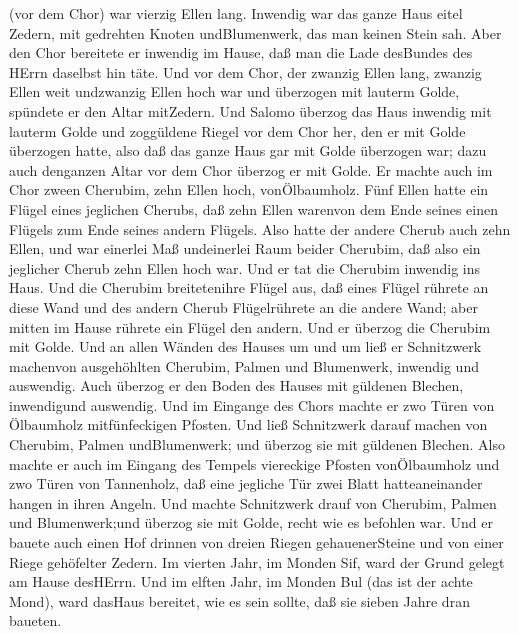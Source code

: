 (vor dem Chor) war vierzig Ellen lang.  Inwendig war das
ganze Haus eitel Zedern, mit gedrehten Knoten undBlumenwerk, das man
keinen Stein sah.  Aber den Chor bereitete er inwendig im
Hause, daß man die Lade desBundes des HErrn daselbst hin täte.
 Und vor dem Chor, der zwanzig Ellen lang, zwanzig Ellen
weit undzwanzig Ellen hoch war und überzogen mit lauterm Golde, spündete
er den Altar mitZedern.  Und Salomo überzog das Haus
inwendig mit lauterm Golde und zoggüldene Riegel vor dem Chor her, den
er mit Golde überzogen hatte,  also daß das ganze Haus gar
mit Golde überzogen war; dazu auch denganzen Altar vor dem Chor überzog
er mit Golde.  Er machte auch im Chor zween Cherubim, zehn
Ellen hoch, vonÖlbaumholz.  Fünf Ellen hatte ein Flügel
eines jeglichen Cherubs, daß zehn Ellen warenvon dem Ende seines einen
Flügels zum Ende seines andern Flügels.  Also hatte der
andere Cherub auch zehn Ellen, und war einerlei Maß undeinerlei Raum
beider Cherubim,  daß also ein jeglicher Cherub zehn Ellen
hoch war.  Und er tat die Cherubim inwendig ins Haus. Und
die Cherubim breitetenihre Flügel aus, daß eines Flügel rührete an diese
Wand und des andern Cherub Flügelrührete an die andere Wand; aber mitten
im Hause rührete ein Flügel den andern.  Und er überzog die
Cherubim mit Golde.  Und an allen Wänden des Hauses um und
um ließ er Schnitzwerk machenvon ausgehöhlten Cherubim, Palmen und
Blumenwerk, inwendig und auswendig.  Auch überzog er den
Boden des Hauses mit güldenen Blechen, inwendigund auswendig.
 Und im Eingange des Chors machte er zwo Türen von
Ölbaumholz mitfünfeckigen Pfosten.  Und ließ Schnitzwerk
darauf machen von Cherubim, Palmen undBlumenwerk; und überzog sie mit
güldenen Blechen.  Also machte er auch im Eingang des
Tempels viereckige Pfosten vonÖlbaumholz  und zwo Türen von
Tannenholz, daß eine jegliche Tür zwei Blatt hatteaneinander hangen in
ihren Angeln.  Und machte Schnitzwerk drauf von Cherubim,
Palmen und Blumenwerk;und überzog sie mit Golde, recht wie es befohlen
war.  Und er bauete auch einen Hof drinnen von dreien
Riegen gehauenerSteine und von einer Riege gehöfelter Zedern.
 Im vierten Jahr, im Monden Sif, ward der Grund gelegt am
Hause desHErrn.  Und im elften Jahr, im Monden Bul (das ist
der achte Mond), ward dasHaus bereitet, wie es sein sollte, daß sie
sieben Jahre dran baueten.

